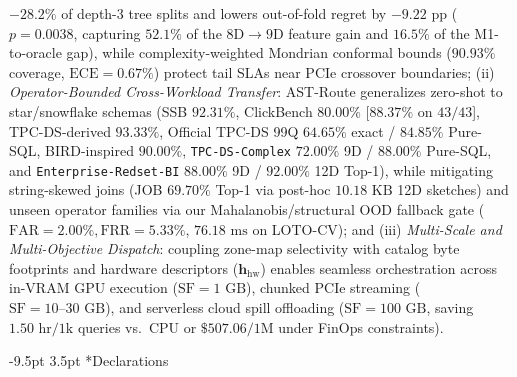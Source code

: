 \documentclass[10pt,a4paper]{article}
\makeatletter
\renewcommand\section{\@startsection{section}{1}{\z@}%
  {-9.5pt \@plus -2pt \@minus -1.5pt}%
  {3.5pt \@plus 1pt}%
  {\normalfont\large\bfseries}}
\makeatother
\begin{document}
$-28.2\%$ of depth-3 tree splits and lowers out-of-fold regret by $-9.22\text{ pp}$ ($p=0.0038$, capturing $52.1\%$ of the $8\text{D}\rightarrow 9\text{D}$ feature gain and $16.5\%$ of the M1-to-oracle gap), while complexity-weighted Mondrian conformal bounds ($90.93\%$ coverage, $\text{ECE}=0.67\%$) protect tail SLAs near PCIe crossover boundaries; (ii) \textit{Operator-Bounded Cross-Workload Transfer}: AST-Route generalizes zero-shot to star/snowflake schemas (SSB $92.31\%$, ClickBench $80.00\%$ [$88.37\%$ on $43/43$], TPC-DS-derived $93.33\%$, Official TPC-DS 99Q $64.65\%$ exact / $84.85\%$ Pure-SQL, BIRD-inspired $90.00\%$, \texttt{TPC-DS-Complex} $72.00\%$ 9D / $88.00\%$ Pure-SQL, and \texttt{Enterprise-Redset-BI} $88.00\%$ 9D / $92.00\%$ 12D Top-1), while mitigating string-skewed joins (JOB $69.70\%$ Top-1 via post-hoc $10.18\text{ KB}$ 12D sketches) and unseen operator families via our Mahalanobis/structural OOD fallback gate ($\text{FAR}=2.00\%, \text{FRR}=5.33\%$, $76.18\text{ ms}$ on LOTO-CV); and (iii) \textit{Multi-Scale and Multi-Objective Dispatch}: coupling zone-map selectivity with catalog byte footprints and hardware descriptors ($\mathbf{h}_{\text{hw}}$) enables seamless orchestration across in-VRAM GPU execution ($\text{SF}=1\text{ GB}$), chunked PCIe streaming ($\text{SF}=10\text{--}30\text{ GB}$), and serverless cloud spill offloading ($\text{SF}=100\text{ GB}$, saving $1.50\text{ hr}/1\text{k}$ queries vs.\ CPU or $\$507.06/1\text{M}$ under FinOps constraints).

\vspace{-8pt}
\section*{Declarations}
\enlargethispage{1.8\baselineskip}
\vspace{-5pt}
\end{document}
